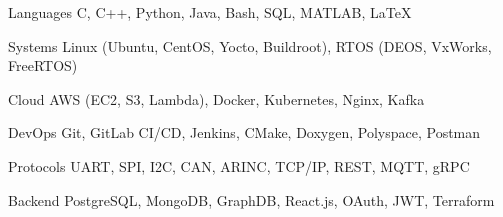 
\begin{cvskills}
  \cvskill
    {Languages}
    {C, C++, Python, Java, Bash, SQL, MATLAB, LaTeX}

  \cvskill
    {Systems}
    {Linux (Ubuntu, CentOS, Yocto, Buildroot), RTOS (DEOS, VxWorks, FreeRTOS)}

  \cvskill
    {Cloud}
    {AWS (EC2, S3, Lambda), Docker, Kubernetes, Nginx, Kafka}

  \cvskill
    {DevOps}
    {Git, GitLab CI/CD, Jenkins, CMake, Doxygen, Polyspace, Postman}

  \cvskill
    {Protocols}
    {UART, SPI, I2C, CAN, ARINC, TCP/IP, REST, MQTT, gRPC}

  \cvskill
    {Backend}
    {PostgreSQL, MongoDB, GraphDB, React.js, OAuth, JWT, Terraform}
\end{cvskills}
